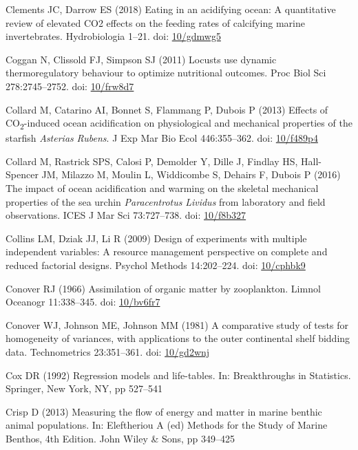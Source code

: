\documentclass[a4paper,10pt, oneside]{memoir}
\begin{document}
\leavevmode\hypertarget{ref-Clements2018}{}%
Clements JC, Darrow ES (2018) Eating in an acidifying ocean: A quantitative review of elevated CO2 effects on the feeding rates of calcifying marine invertebrates. Hydrobiologia 1--21. doi: \href{https://doi.org/10/gdmwg5}{10/gdmwg5}

\leavevmode\hypertarget{ref-Coggan2011}{}%
Coggan N, Clissold FJ, Simpson SJ (2011) Locusts use dynamic thermoregulatory behaviour to optimize nutritional outcomes. Proc Biol Sci 278:2745--2752. doi: \href{https://doi.org/10/frw8d7}{10/frw8d7}

\leavevmode\hypertarget{ref-Collard2013}{}%
Collard M, Catarino AI, Bonnet S, Flammang P, Dubois P (2013) Effects of CO\textsubscript{2}-induced ocean acidification on physiological and mechanical properties of the starfish \emph{Asterias} \emph{Rubens}. J Exp Mar Bio Ecol 446:355--362. doi: \href{https://doi.org/10/f489p4}{10/f489p4}

\leavevmode\hypertarget{ref-Collard2016}{}%
Collard M, Rastrick SPS, Calosi P, Demolder Y, Dille J, Findlay HS, Hall-Spencer JM, Milazzo M, Moulin L, Widdicombe S, Dehairs F, Dubois P (2016) The impact of ocean acidification and warming on the skeletal mechanical properties of the sea urchin \emph{Paracentrotus} \emph{Lividus} from laboratory and field observations. ICES J Mar Sci 73:727--738. doi: \href{https://doi.org/10/f8b327}{10/f8b327}

\leavevmode\hypertarget{ref-Collins2009}{}%
Collins LM, Dziak JJ, Li R (2009) Design of experiments with multiple independent variables: A resource management perspective on complete and reduced factorial designs. Psychol Methods 14:202--224. doi: \href{https://doi.org/10/cphbk9}{10/cphbk9}

\leavevmode\hypertarget{ref-Conover1966}{}%
Conover RJ (1966) Assimilation of organic matter by zooplankton. Limnol Oceanogr 11:338--345. doi: \href{https://doi.org/10/bv6fr7}{10/bv6fr7}

\leavevmode\hypertarget{ref-Conover1981}{}%
Conover WJ, Johnson ME, Johnson MM (1981) A comparative study of tests for homogeneity of variances, with applications to the outer continental shelf bidding data. Technometrics 23:351--361. doi: \href{https://doi.org/10/gd2wnj}{10/gd2wnj}

\leavevmode\hypertarget{ref-Cox1992}{}%
Cox DR (1992) Regression models and life-tables. In: Breakthroughs in Statistics. Springer, New York, NY, pp 527--541

\leavevmode\hypertarget{ref-Crisp2013}{}%
Crisp D (2013) Measuring the flow of energy and matter in marine benthic animal populations. In: Eleftheriou A (ed) Methods for the Study of Marine Benthos, 4th Edition. John Wiley \& Sons, pp 349--425
\end{document}
